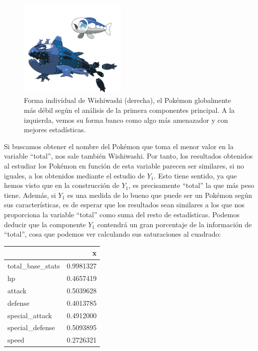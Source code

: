 \documentclass[
  12pt,
]{extreport}
\begin{document}
\begin{figure}[H]

{\centering \includegraphics[width=2.03125in,height=\textheight]{trabajo_images/wishiwashi.png}

}

\caption{Forma individual de Wishiwashi (derecha), el Pokémon
globalmente más débil según el análisis de la primera componentes
principal. A la izquierda, vemos su forma banco como algo más amenazador
y con mejores estadísticas.}

\end{figure}%

Si buscamos obtener el nombre del Pokémon que toma el menor valor en la
variable ``total'', nos sale también Wishiwashi. Por tanto, los
resultados obtenidos al estudiar los Pokémon en función de esta variable
parecen ser similares, si no iguales, a los obtenidos mediante el
estudio de \(Y_1\). Esto tiene sentido, ya que hemos visto que en la
construcción de \(Y_1\), es precisamente ``total'' la que más peso
tiene. Además, si \(Y_1\) es una medida de lo bueno que puede ser un
Pokémon según sus características, es de esperar que los resultados sean
similares a los que nos proporciona la variable ``total'' como suma del
resto de estadísticas. Podemos deducir que la componente \(Y_1\)
contendrá un gran porcentaje de la información de ``total'', cosa que
podemos ver calculando sus saturaciones al cuadrado:

\begin{table}[H]
\centering\begingroup\fontsize{10.5}{12.5}\selectfont

\begin{tabular}{lr}
\toprule
  & x\\
\midrule
total\_base\_stats & 0.9981327\\
hp & 0.4657419\\
attack & 0.5039628\\
defense & 0.4013785\\
special\_attack & 0.4912000\\
\addlinespace
special\_defense & 0.5093895\\
speed & 0.2726321\\
\bottomrule
\end{tabular}
\endgroup{}
\end{table}
\end{document}
